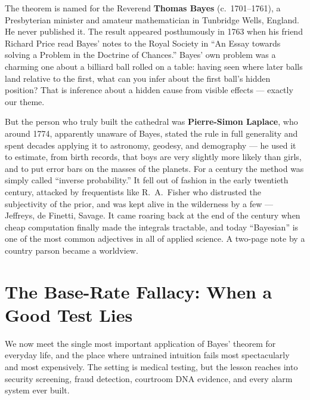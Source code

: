 \begin{historybox}
The theorem is named for the Reverend \textbf{Thomas Bayes} (c.\ 1701--1761), a
Presbyterian minister and amateur mathematician in Tunbridge Wells, England. He never
published it. The result appeared posthumously in 1763 when his friend Richard Price
read Bayes' notes to the Royal Society in ``An Essay towards solving a Problem in the
Doctrine of Chances.'' Bayes' own problem was a charming one about a billiard ball rolled
on a table: having seen where later balls land relative to the first, what can you infer
about the first ball's hidden position? That is inference about a hidden cause from
visible effects --- exactly our theme.

But the person who truly built the cathedral was \textbf{Pierre-Simon Laplace}, who
around 1774, apparently unaware of Bayes, stated the rule in full generality and spent
decades applying it to astronomy, geodesy, and demography --- he used it to estimate,
from birth records, that boys are very slightly more likely than girls, and to put error
bars on the masses of the planets. For a century the method was simply called ``inverse
probability.'' It fell out of fashion in the early twentieth century, attacked by
frequentists like R.\ A.\ Fisher who distrusted the subjectivity of the prior, and was
kept alive in the wilderness by a few --- Jeffreys, de Finetti, Savage. It came roaring
back at the end of the century when cheap computation finally made the integrals
tractable, and today ``Bayesian'' is one of the most common adjectives in all of applied
science. A two-page note by a country parson became a worldview.
\end{historybox}

\section{The Base-Rate Fallacy: When a Good Test Lies}
\label{ch05:base-rate}

We now meet the single most important application of Bayes' theorem for everyday life,
and the place where untrained intuition fails most spectacularly and most expensively.
The setting is medical testing, but the lesson reaches into security screening,
fraud detection, courtroom DNA evidence, and every alarm system ever built.

